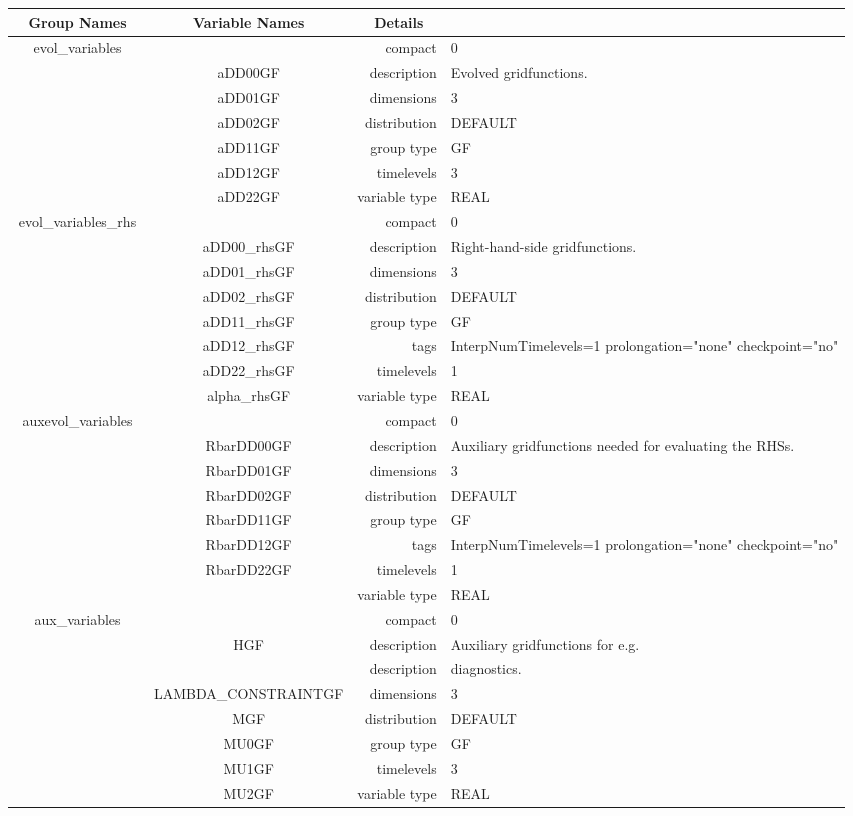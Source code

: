 \begin{tabular*}{150mm}{|c|c@{\extracolsep{\fill}}|rl|} \hline 
~ {\bf Group Names} ~ & ~ {\bf Variable Names} ~  &{\bf Details} ~ & ~\\ 
\hline 
evol\_variables &  & compact & 0 \\ 
 & aDD00GF & description & Evolved gridfunctions. \\ 
 & aDD01GF & dimensions & 3 \\ 
 & aDD02GF & distribution & DEFAULT \\ 
 & aDD11GF & group type & GF \\ 
 & aDD12GF & timelevels & 3 \\ 
 & aDD22GF & variable type & REAL \\ 
\hline 
evol\_variables\_rhs &  & compact & 0 \\ 
 & aDD00\_rhsGF & description & Right-hand-side gridfunctions. \\ 
 & aDD01\_rhsGF & dimensions & 3 \\ 
 & aDD02\_rhsGF & distribution & DEFAULT \\ 
 & aDD11\_rhsGF & group type & GF \\ 
 & aDD12\_rhsGF & tags & InterpNumTimelevels=1 prolongation="none" checkpoint="no" \\ 
 & aDD22\_rhsGF & timelevels & 1 \\ 
 & alpha\_rhsGF & variable type & REAL \\ 
\hline 
auxevol\_variables &  & compact & 0 \\ 
 & RbarDD00GF & description & Auxiliary gridfunctions needed for evaluating the RHSs. \\ 
 & RbarDD01GF & dimensions & 3 \\ 
 & RbarDD02GF & distribution & DEFAULT \\ 
 & RbarDD11GF & group type & GF \\ 
 & RbarDD12GF & tags & InterpNumTimelevels=1 prolongation="none" checkpoint="no" \\ 
 & RbarDD22GF & timelevels & 1 \\ 
 &  & variable type & REAL \\ 
\hline 
aux\_variables &  & compact & 0 \\ 
 & HGF & description & Auxiliary gridfunctions for e.g. \\ 
& ~ & description &  diagnostics. \\ 
 & LAMBDA\_CONSTRAINTGF & dimensions & 3 \\ 
 & MGF & distribution & DEFAULT \\ 
 & MU0GF & group type & GF \\ 
 & MU1GF & timelevels & 3 \\ 
 & MU2GF & variable type & REAL \\ 
\hline 
\end{tabular*} 



